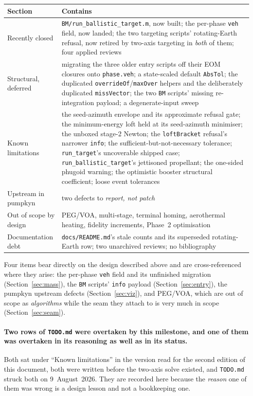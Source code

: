 \documentclass[11pt]{article}
\newcommand{\code}[1]{\texttt{#1}}
\begin{document}
\begin{center}
\begin{tabular}{p{3.6cm}p{11.0cm}}
\toprule
Section & Contains \\
\midrule
Recently closed        & \code{BM/run\_ballistic\_target.m}, now built; the per-phase \code{veh} field, now landed; the two targeting scripts' rotating-Earth refusal, now retired by two-axis targeting in \emph{both} of them; four applied reviews \\
Structural, deferred   & migrating the three older entry scripts off their EOM closures onto \code{phase.veh}; a state-scaled default \code{AbsTol}; the duplicated \code{overrideOf}/\code{maxOver} helpers and the deliberately duplicated \code{missVector}; the two \code{BM} scripts' missing re-integration payload; a degenerate-input sweep \\
Known limitations      & the seed-azimuth envelope and its approximate refusal gate; the minimum-energy loft held at its seed-azimuth minimiser; the unboxed stage-2 Newton; the \code{loftBracket} refusal's narrower \code{info}; the sufficient-but-not-necessary tolerance; \code{run\_target}'s uncoverable shipped case; \code{run\_ballistic\_target}'s jettisoned propellant; the one-sided phugoid warning; the optimistic booster structural coefficient; loose event tolerances \\
Upstream in pumpkyn    & two defects to \emph{report, not patch} \\
Out of scope by design & PEG/VOA, multi-stage, terminal homing, aerothermal heating, fidelity increments, Phase~2 optimisation \\
Documentation debt     & \code{docs/README.md}'s stale counts and its superseded rotating-Earth row; two unarchived reviews; no bibliography \\
\bottomrule
\end{tabular}
\end{center}

Four items bear directly on the design described above and are cross-referenced
where they arise: the per-phase \code{veh} field and its unfinished migration
(Section~\ref{sec:mass}), the \code{BM} scripts' \code{info} payload
(Section~\ref{sec:entry}), the pumpkyn upstream defects
(Section~\ref{sec:viz}), and PEG/VOA, which are out of scope as
\emph{algorithms} while the seam they attach to is very much in scope
(Section~\ref{sec:seam}).

\paragraph{Two rows of \code{TODO.md} were overtaken by this milestone, and one
of them was overtaken in its reasoning as well as in its status.} Both sat
under ``Known limitations'' in the version read for the second edition of this
document, both were written before the two-axis solve existed, and
\code{TODO.md} struck both on 9~August~2026. They are recorded here because the
\emph{reason} one of them was wrong is a design lesson and not a bookkeeping
one.
\end{document}
